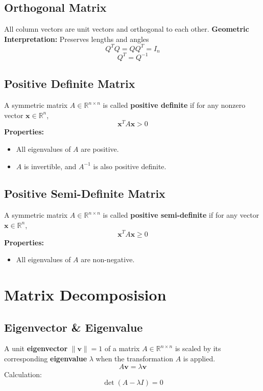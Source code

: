 \documentclass{article}
\begin{document}
\subsection{Orthogonal Matrix}
All column vectors are unit vectors and orthogonal to each other.
\newline
\textbf{Geometric Interpretation:} Preserves lengths and angles
\[
    Q^T Q = Q Q^T = I_n
\]
\[
    Q^T = Q^{-1}
\]

\subsection{Positive Definite Matrix}
A symmetric matrix $A \in \mathbb{R}^{n \times n}$ is called \textbf{positive definite} if for any nonzero vector $\mathbf{x} \in \mathbb{R}^n$,
\[
    \mathbf{x}^T A \mathbf{x} > 0
\]
\textbf{Properties:}
\begin{itemize}
    \item All eigenvalues of $A$ are positive.
    \item $A$ is invertible, and $A^{-1}$ is also positive definite.
\end{itemize}

\subsection{Positive Semi-Definite Matrix}
A symmetric matrix $A \in \mathbb{R}^{n \times n}$ is called \textbf{positive semi-definite} if for any vector $\mathbf{x} \in \mathbb{R}^n$,
\[
    \mathbf{x}^T A \mathbf{x} \geq 0
\]
\textbf{Properties:}
\begin{itemize}
    \item All eigenvalues of $A$ are non-negative.
\end{itemize}


\newpage
\section{Matrix Decomposision}

\subsection{Eigenvector \& Eigenvalue}

A unit \textbf{eigenvector} $\|\mathbf{v}\| = 1$ of a matrix $A \in \mathbb{R}^{n \times n}$ is scaled by its corresponding \textbf{eigenvalue} $\lambda$ when the transformation $A$ is applied.
\[
    A\mathbf{v} = \lambda \mathbf{v}
\]
Calculation:
\[
    \det(A - \lambda I) = 0
\]
\end{document}
